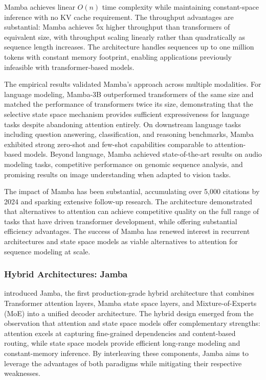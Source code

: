 Mamba achieves linear $O(n)$ time complexity while maintaining constant-space inference with no KV cache requirement. The throughput advantages are substantial: Mamba achieves 5x higher throughput than transformers of equivalent size, with throughput scaling linearly rather than quadratically as sequence length increases. The architecture handles sequences up to one million tokens with constant memory footprint, enabling applications previously infeasible with transformer-based models.

The empirical results validated Mamba's approach across multiple modalities. For language modeling, Mamba-3B outperformed transformers of the same size and matched the performance of transformers twice its size, demonstrating that the selective state space mechanism provides sufficient expressiveness for language tasks despite abandoning attention entirely. On downstream language tasks including question answering, classification, and reasoning benchmarks, Mamba exhibited strong zero-shot and few-shot capabilities comparable to attention-based models. Beyond language, Mamba achieved state-of-the-art results on audio modeling tasks, competitive performance on genomic sequence analysis, and promising results on image understanding when adapted to vision tasks.

The impact of Mamba has been substantial, accumulating over 5,000 citations by 2024 and sparking extensive follow-up research. The architecture demonstrated that alternatives to attention can achieve competitive quality on the full range of tasks that have driven transformer development, while offering substantial efficiency advantages. The success of Mamba has renewed interest in recurrent architectures and state space models as viable alternatives to attention for sequence modeling at scale.

\subsubsection{Hybrid Architectures: Jamba}

\citet{lieber2024jamba} introduced Jamba, the first production-grade hybrid architecture that combines Transformer attention layers, Mamba state space layers, and Mixture-of-Experts (MoE) into a unified decoder architecture. The hybrid design emerged from the observation that attention and state space models offer complementary strengths: attention excels at capturing fine-grained dependencies and content-based routing, while state space models provide efficient long-range modeling and constant-memory inference. By interleaving these components, Jamba aims to leverage the advantages of both paradigms while mitigating their respective weaknesses.

